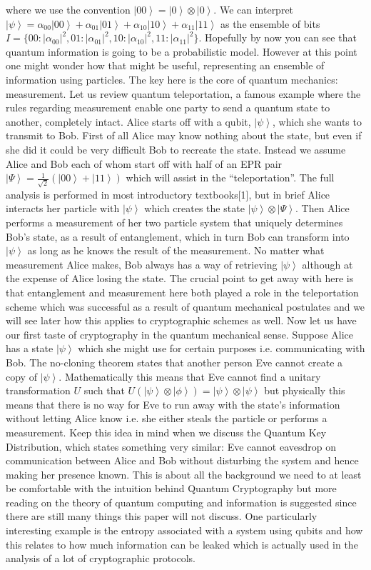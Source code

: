 \documentclass[aps,prd,final,twocolumn,letterpaper]{revtex4}
\newcommand{\ket}[1]{\left|#1\right\rangle}
\begin{document}
where we use the convention $\ket{00}=\ket{0}\otimes \ket{0}$. We can interpret $\ket{\psi} = \alpha_{00}\ket{00}+\alpha_{01}\ket{01}+\alpha_{10}\ket{10}+\alpha_{11}\ket{11}$ as the ensemble of bits $I=\{00:|\alpha_{00}|^2,01:|\alpha_{01}|^2,10:|\alpha_{10}|^2,11:|\alpha_{11}|^2\}$. Hopefully by now you can see that quantum information is going to be a probabilistic model. However at this point one might wonder how that might be useful, representing an ensemble of information using particles. The key here is the core of quantum mechanics: measurement. Let us review quantum teleportation, a famous example where the rules regarding measurement enable one party to send a quantum state to another, completely intact. Alice starts off with a qubit, $\ket{\psi}$, which she wants to transmit to Bob. First of all Alice may know nothing about the state, but even if she did it could be very difficult Bob to recreate the state. Instead we assume Alice and Bob each of whom start off with half of an EPR pair $\ket{\Psi}=\frac{1}{\sqrt{2}} (\ket{00}+\ket{11})$ which will assist in the ``teleportation''. The full analysis is performed in most introductory textbooks[1], but in brief Alice interacts her particle with $\ket{\psi}$ which creates the state $\ket{\psi} \otimes \ket{\Psi}$. Then Alice performs a measurement of her two particle system  that uniquely determines Bob's state, as a result of entanglement, which in turn Bob can transform into $\ket{\psi}$ as long as he knows the result of the measurement. No matter what measurement Alice makes, Bob always has a way of retrieving $\ket{\psi}$ although at the expense of Alice losing the state. The crucial point to get away with here is that entanglement and measurement here both played a role in the teleportation scheme which was successful as a result of quantum mechanical postulates and we will see later how this applies to cryptographic schemes as well. Now let us have our first taste of cryptography in the quantum mechanical sense. Suppose Alice has a state $\ket{\psi}$ which she might use for certain purposes i.e. communicating with Bob. The no-cloning theorem states that another person Eve cannot create a copy of $\ket{\psi}$. Mathematically this means that Eve cannot find a unitary transformation $U$ such that $U(\ket{\psi}\otimes\ket{\phi}) = \ket{\psi}\otimes\ket{\psi}$ but physically this means that there is no way for Eve to run away with the state's information without letting Alice know i.e. she either steals the particle or performs a measurement. Keep this idea in mind when we discuss the Quantum Key Distribution, which states something very similar: Eve cannot eavesdrop on communication between Alice and Bob without disturbing the system and hence making her presence known. This is about all the background we need to at least be comfortable with the intuition behind Quantum Cryptography but more reading on the theory of quantum computing and information is suggested since there are still many things this paper will not discuss. One particularly interesting example is the entropy associated with a system using qubits and how this relates to how much information can be leaked which is actually used in the analysis of a lot of cryptographic protocols.
\end{document}
